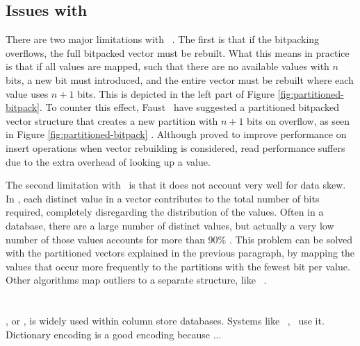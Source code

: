 \subsection{Issues with \bp}
\label{sub:Issues with Bitpacking}
There are two major limitations with \bp~\cite{Faust2015-ke}. The first is that if the bitpacking overflows, the full bitpacked vector must be rebuilt. What this means in practice is that if all values are mapped, such that there are no available values with $n$ bits, a new bit must introduced, and the entire vector must be rebuilt where each value uses $n + 1$ bits. This is depicted in the left part of Figure \ref{fig:partitioned-bitpack}. To counter this effect, Faust \ea~have suggested a partitioned bitpacked vector structure that creates a new partition with $n + 1$ bits on overflow, as seen in Figure \ref{fig:partitioned-bitpack} \cite{Faust2015-ke}. Although proved to improve performance on insert operations when vector rebuilding is considered, read performance suffers due to the extra overhead of looking up a value.

The second limitation with \bp~is that it does not account very well for data skew. In \bp, each distinct value in a vector contributes to the total number of bits required, completely disregarding the distribution of the values. Often in a database, there are a large number of distinct values, but actually a very low number of those values accounts for more than 90\% \cite{Faust2015-ke}. This problem can be solved with the partitioned vectors explained in the previous paragraph, by mapping the values that occur more frequently to the partitions with the fewest bit per value. Other algorithms map outliers to a separate structure, like \pfdelta~\cite{Bjorklund2011-wh}.

\section{\de}
\label{sec:Dictionary Encoding}
\de, or , is widely used within column store databases. Systems like \ibm~\cite{Raman2013-em}, \saph~\cite{Farber2012-vh}use it. Dictionary encoding is a good encoding because ... \ea~\cite{Faust2015-ke}

